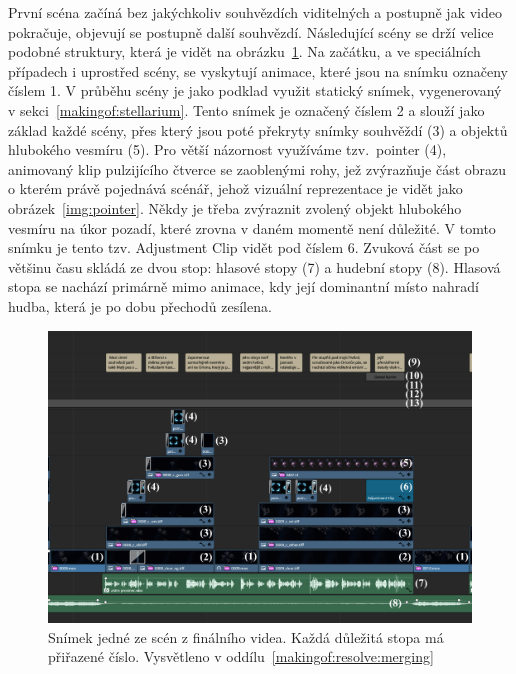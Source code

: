 \documentclass[12pt,a4paper,titlepage]{article}
\begin{document}
První scéna začíná bez jakýchkoliv souhvězdích viditelných a postupně jak video pokračuje, objevují se postupně další souhvězdí. Následující scény se drží velice podobné struktury, která je vidět na obrázku~\ref{img:timeline}. Na začátku, a ve speciálních případech i uprostřed scény, se vyskytují animace, které jsou na snímku označeny číslem 1. V průběhu scény je jako podklad využit statický snímek, vygenerovaný v sekci~\ref{makingof:stellarium}. Tento snímek je označený číslem 2 a slouží jako základ každé scény, přes který jsou poté překryty snímky souhvěždí (3) a objektů hlubokého vesmíru (5). Pro větší názornost využíváme tzv.\ pointer (4), animovaný klip pulzijícího čtverce se zaoblenými rohy, jež zvýrazňuje část obrazu o kterém právě pojednává scénář, jehož vizuální reprezentace je vidět jako obrázek~\ref{img:pointer}. Někdy je třeba zvýraznit zvolený objekt hlubokého vesmíru na úkor pozadí, které zrovna v daném momentě není důležité. V tomto snímku je tento tzv. Adjustment Clip vidět pod číslem 6. Zvuková část se po většinu času skládá ze dvou stop: hlasové stopy (7) a hudební stopy (8). Hlasová stopa se nachází primárně mimo animace, kdy její dominantní místo nahradí hudba, která je po dobu přechodů zesílena.

\begin{figure}[H]
	\centering
	\includegraphics[width=1\textwidth]{timeline_annotated.eps}
	\caption{Snímek jedné ze scén z finálního videa. Každá důležitá stopa má přiřazené číslo. Vysvětleno v oddílu~\ref{makingof:resolve:merging}}\label{img:timeline}
\end{figure}
\end{document}
